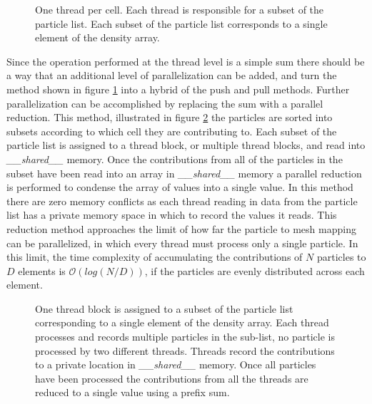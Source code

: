 \begin{figure}
\begin{center}

\end{center}
\caption[One thread per cell]{One thread per cell. Each thread is responsible for a subset of the particle list. Each subset of the particle list corresponds to a single element of the density array.}
\label{fig:one_thread_per_cell}
\end{figure}

Since the operation performed at the thread level is a simple sum there should be a way that an additional level of parallelization can be added, and turn the method shown in figure \ref{fig:one_thread_per_cell} into a hybrid of the push and pull methods. Further parallelization can be accomplished by replacing the sum with a parallel reduction. This method, illustrated in figure \ref{fig:one_cell_per_block} the particles are sorted into subsets according to which cell they are contributing to. Each subset of the particle list is assigned to a thread block, or multiple thread blocks, and read into \emph{\_\_shared\_\_} memory. Once the contributions from all of the particles in the subset have been read into an array in \emph{\_\_shared\_\_} memory a parallel reduction is performed to condense the array of values into a single value. In this method there are zero memory conflicts as each thread reading in data from the particle list has a private memory space in which to record the values it reads. 
This reduction method approaches the limit of how far the particle to mesh mapping can be parallelized, in which every thread must process only a single particle. In this limit, the time complexity of accumulating the contributions of $N$ particles to $D$ elements is $\mathcal{O}(log(N/D))$, if the particles are evenly distributed across each element. 

\begin{figure}
\begin{center}

\end{center}
\caption[One thread block per cell]{One thread block is assigned to a subset of the particle list corresponding to a single element of the density array. Each thread processes and records multiple particles in the sub-list, no particle is processed by two different threads. Threads record the contributions to a private location in \emph{\_\_shared\_\_} memory. Once all particles have been processed the contributions from all the threads are reduced to a single value using a prefix sum.}
\label{fig:one_cell_per_block}
\end{figure}




